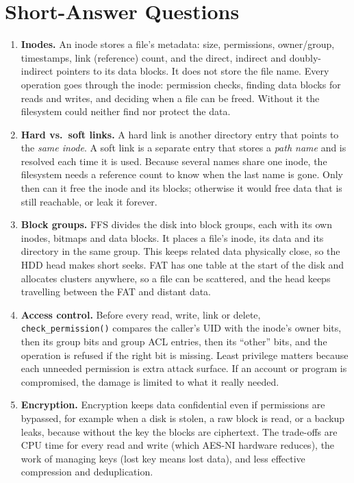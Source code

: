 \documentclass[11pt]{article}
\begin{document}
\section{Short-Answer Questions}
\begin{enumerate}[leftmargin=*]
\item \textbf{Inodes.} An inode stores a file's metadata: size, permissions,
  owner/group, timestamps, link (reference) count, and the direct, indirect
  and doubly-indirect pointers to its data blocks. It does not store the
  file name. Every operation goes through the inode: permission checks,
  finding data blocks for reads and writes, and deciding when a file can be
  freed. Without it the filesystem could neither find nor protect the data.

\item \textbf{Hard vs.\ soft links.} A hard link is another directory entry
  that points to the \emph{same inode}. A soft link is a separate entry
  that stores a \emph{path name} and is resolved each time it is used.
  Because several names share one inode, the filesystem needs a reference
  count to know when the last name is gone. Only then can it free the inode
  and its blocks; otherwise it would free data that is still reachable, or
  leak it forever.

\item \textbf{Block groups.} FFS divides the disk into block groups, each
  with its own inodes, bitmaps and data blocks. It places a file's inode,
  its data and its directory in the same group. This keeps related data
  physically close, so the HDD head makes short seeks. FAT has one table at
  the start of the disk and allocates clusters anywhere, so a file can be
  scattered, and the head keeps travelling between the FAT and distant data.

\item \textbf{Access control.} Before every read, write, link or delete,
  \texttt{check\_permission()} compares the caller's UID with the inode's
  owner bits, then its group bits and group ACL entries, then its ``other''
  bits, and the operation is refused if the right bit is missing. Least
  privilege matters because each unneeded permission is extra attack
  surface. If an account or program is compromised, the damage is limited
  to what it really needed.

\item \textbf{Encryption.} Encryption keeps data confidential even if
  permissions are bypassed, for example when a disk is stolen, a raw block
  is read, or a backup leaks, because without the key the blocks are
  ciphertext. The trade-offs are CPU time for every read and write (which
  AES-NI hardware reduces), the work of managing keys (lost key means lost
  data), and less effective compression and deduplication.


\end{enumerate}
\end{document}
